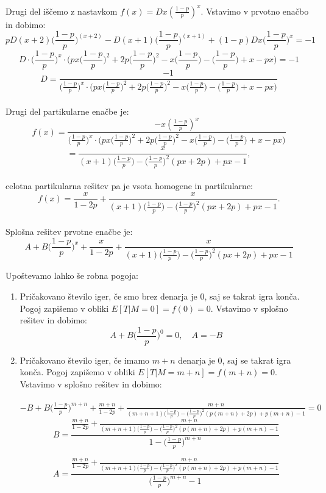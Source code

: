 \documentclass[12pt, a4paper]{article}
\begin{document}
Drugi del iščemo z nastavkom $f(x) = D x (\frac{1-p}{p})^x$. Vstavimo v prvotno enačbo in dobimo:
$$pD(x+2)\bigg( \frac{1-p}{p} \bigg )^{(x+2)} - D(x+1)\bigg( \frac{1-p}{p} \bigg )^{(x+1 )}+(1-p)Dx\bigg( \frac{1-p}{p} \bigg )^x = -1$$ 
$$D \cdot \bigg( \frac{1-p}{p} \bigg )^x \cdot \bigg( px\bigg( \frac{1-p}{p} \bigg )^2 + 2p\bigg( \frac{1-p}{p} \bigg )^2 -x\bigg( \frac{1-p}{p} \bigg )-\bigg( \frac{1-p}{p} \bigg )+x-px \bigg )= -1$$ 
$$D = \frac{-1}{\big( \frac{1-p}{p} \big )^x \cdot \big( px\big( \frac{1-p}{p} \big )^2 + 2p\big( \frac{1-p}{p} \big )^2 -x\big( \frac{1-p}{p} \big )-\big( \frac{1-p}{p} \big )+x-px \big )}$$ 
\\
Drugi del partikularne enačbe je: $$f(x) = \frac{-x  (\frac{1-p}{p})^x}{\big( \frac{1-p}{p} \big )^x \cdot \big( px\big( \frac{1-p}{p} \big )^2 + 2p\big( \frac{1-p}{p} \big )^2 -x\big( \frac{1-p}{p} \big )-\big( \frac{1-p}{p} \big )+x-px \big )}$$ $$= \frac{x}{(x+1)\big( \frac{1-p}{p} \big )-\big( \frac{1-p}{p} \big )^2(px+2p)+px-1},$$\\
celotna partikularna rešitev pa je vsota homogene in partikularne: $$f(x)=\frac{x}{1-2p}+\frac{x}{(x+1)\big( \frac{1-p}{p} \big )-\big( \frac{1-p}{p} \big )^2(px+2p)+px-1}.$$\\

Splošna rešitev prvotne enačbe je: $$A + B\bigg( \frac{1-p}{p} \bigg )^x+\frac{x}{1-2p}+\frac{x}{(x+1)\big( \frac{1-p}{p} \big )-\big( \frac{1-p}{p} \big )^2(px+2p)+px-1}$$

Upoštevamo lahko še robna pogoja:
\begin{enumerate}
\item Pričakovano število iger, če smo brez denarja je 0, saj se takrat igra konča. Pogoj zapišemo v obliki $E[T|M= 0] = f(0) = 0$. Vstavimo v splošno rešitev in dobimo:
$$A + B\bigg( \frac{1-p}{p} \bigg )^0 = 0, \quad A = -B$$
\item Pričakovano število iger, če imamo $m+n$ denarja je 0, saj se takrat igra konča. Pogoj zapišemo v obliki $E[T|M= m+n] = f(m+n) = 0$. Vstavimo v splošno rešitev in dobimo:\\\\
$-B + B\bigg( \frac{1-p}{p} \bigg )^{m+n}+\frac{m+n}{1-2p}+\frac{m+n}{(m+n+1)\big( \frac{1-p}{p} \big )-\big( \frac{1-p}{p} \big )^2(p(m+n)+2p)+p(m+n)-1}=0$\\

$$B = \frac{\frac{m+n}{1-2p}+\frac{m+n}{(m+n+1)\big( \frac{1-p}{p} \big )-\big( \frac{1-p}{p} \big )^2(p(m+n)+2p)+p(m+n)-1}}{1-\big( \frac{1-p}{p} \big )^{m+n}}$$

$$A = \frac{\frac{m+n}{1-2p}+\frac{m+n}{(m+n+1)\big( \frac{1-p}{p} \big )-\big( \frac{1-p}{p} \big )^2(p(m+n)+2p)+p(m+n)-1}}{\big( \frac{1-p}{p} \big )^{m+n}-1}$$
\end{enumerate}
\end{document}
